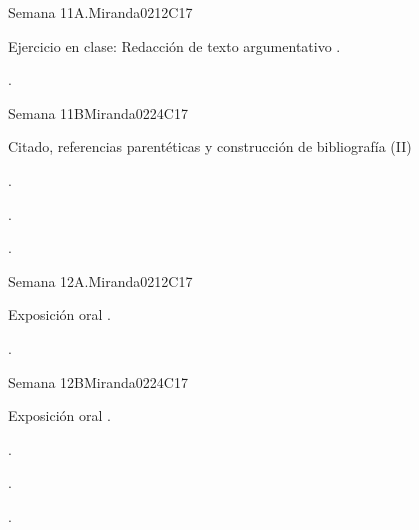 \begin{syllabus}
\begin{unit}{Semana 11A.}{}{Miranda02}{12}{C17}
   \begin{topics}
      \item Ejercicio en clase: Redacción de texto argumentativo .
   \end{topics}
   \begin{learningoutcomes}
      \item . 
   \end{learningoutcomes}
\end{unit}

\begin{unit}{Semana 11B}{}{Miranda02}{24}{C17}
   \begin{topics}
      \item Citado, referencias parentéticas y construcción de bibliografía (II)
   \end{topics}

   \begin{learningoutcomes}
      \item . 
      \item .
      \item . 
      \end{learningoutcomes}
\end{unit}

\begin{unit}{Semana 12A.}{}{Miranda02}{12}{C17}
   \begin{topics}
      \item Exposición oral .
   \end{topics}
   \begin{learningoutcomes}
      \item . 
   \end{learningoutcomes}
\end{unit}

\begin{unit}{Semana 12B}{}{Miranda02}{24}{C17}
   \begin{topics}
      \item Exposición oral .
   \end{topics}

   \begin{learningoutcomes}
      \item . 
      \item .
      \item . 
      \end{learningoutcomes}
\end{unit}


\end{syllabus}
